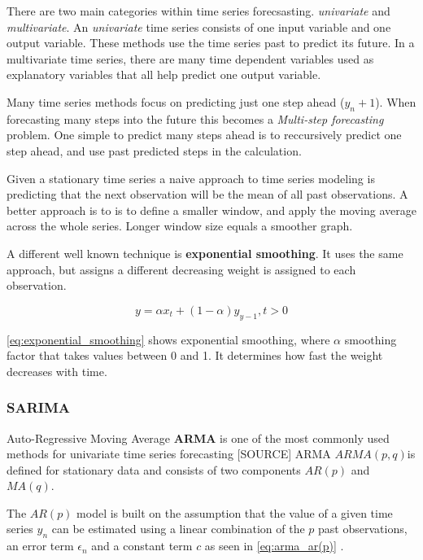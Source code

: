 There are two main categories within time series forecsasting. \textit{univariate} and \textit{multivariate}. 
An \textit{univariate} time series consists of one input variable and one output variable. These methods use the time series past to predict its future.
In a multivariate time series, there are many time dependent variables used as explanatory variables that all help predict one output variable.

Many time series methods focus on predicting just one step ahead ($y_n+1$). When forecasting many steps into the future this becomes a 
\textit{Multi-step forecasting} problem. One simple to predict many steps ahead is to reccursively predict one step ahead, and use past predicted steps 
in the calculation.


Given a stationary time series a naive approach to time series modeling is predicting that the next observation will be the
mean of all past observations. A better approach is to is to define a smaller window, and
apply the moving average across the whole series. Longer window size equals a smoother graph.

A different well known technique is \textbf{exponential smoothing}. It uses the same approach,
but assigns a different decreasing weight is assigned to each observation.

\begin{equation}
    \label{eq:exponential_smoothing}
    y = \alpha x_t + (1 - \alpha)y_{y-1}, t > 0
\end{equation}

\autoref{eq:exponential_smoothing}
shows exponential smoothing, where $\alpha$ smoothing factor
that takes values between 0 and 1. It determines how fast the weight decreases with time.



\subsubsection{SARIMA}
Auto-Regressive Moving Average \textbf{ARMA} is one of the most commonly used methods for univariate time series forecasting [SOURCE]
ARMA $ARMA(p, q)$is defined for stationary data and consists of two components $AR(p)$ and $MA(q)$.

The $AR(p)$ model is built on the assumption that the value of a given time series $y_n$ can be estimated using a linear combination
of the $p$ past observations, an error term $\epsilon_n$ and a constant term $c$ as seen in \autoref{eq:arma_ar(p)} \cite{Box2016}.

